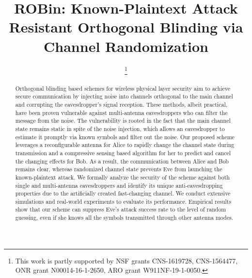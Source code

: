 \documentclass[10pt, conference, letterpaper]{IEEEtran}
\begin{document}
\title{ROBin:  Known-Plaintext Attack Resistant Orthogonal Blinding via  Channel Randomization }
\author{
\thanks{This work is partly supported by NSF grants CNS-1619728, CNS-1564477, ONR grant N00014-16-1-2650, ARO grant W911NF-19-1-0050.}}

\maketitle
\begin{abstract}
Orthogonal blinding based schemes for wireless physical layer security aim to achieve secure communication by injecting noise into channels orthogonal to the main channel and corrupting the eavesdropper's signal reception. These methods, albeit practical, have been proven vulnerable against multi-antenna eavesdroppers who can filter the message from the noise. The vulnerability is rooted in the fact that the main channel state remains static in spite of the noise injection, which allows an eavesdropper to estimate it promptly via known symbols and filter out the noise. Our proposed scheme leverages a reconfigurable antenna for Alice to rapidly change the channel state during transmission and a compressive sensing based algorithm for her to predict and cancel the changing effects for Bob. As a result, the communication between Alice and Bob remains clear, whereas randomized channel state prevents Eve from launching the known-plaintext attack. We formally analyze the security of the scheme against both single and multi-antenna eavesdroppers and identify its unique anti-eavesdropping properties due to the artificially created fast-changing channel. We conduct extensive simulations and real-world experiments to evaluate its performance. Empirical results show that our scheme can suppress Eve's attack success rate to the level of random guessing, even if she knows all the symbols transmitted through other antenna modes.
\end{abstract}

\IEEEpeerreviewmaketitle










% 


% 


\end{document}
